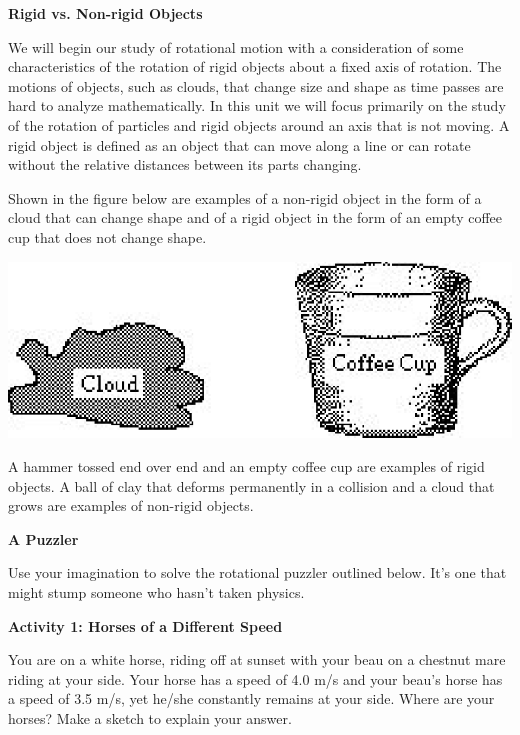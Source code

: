 \textbf{Rigid vs. Non-rigid Objects} 

We will begin our study of rotational motion with a consideration of some characteristics
of the rotation of rigid objects about a fixed axis of rotation. The motions
of objects, such as clouds, that change size and shape as time passes are hard
to analyze mathematically. In this unit we will focus primarily on the study
of the rotation of particles and rigid objects around an axis that is not moving.
A rigid object is defined as an object that can move along a line or can rotate
without the relative distances between its parts changing. 

Shown in the figure below are examples of a non-rigid object in the form of
a cloud that can change shape and of a rigid object in the form of an empty
coffee cup that does not change shape.

\vspace{0.3cm}
{\par\centering \includegraphics{rotation/rotation_fig1.eps} \par}
\vspace{0.3cm}

A hammer tossed end over end and an empty coffee cup are examples of rigid objects.
A ball of clay that deforms permanently in a collision and a cloud that grows
are examples of non-rigid objects. 
\vspace{0.3cm}

\textbf{A Puzzler} 

Use your imagination to solve the rotational puzzler outlined below. It's one
that might stump someone who hasn't taken physics.

\textbf{Activity 1: Horses of a Different Speed }

You are on a white horse, riding off at sunset with your beau on a chestnut
mare riding at your side. Your horse has a speed of 4.0 m/s and your beau's
horse has a speed of 3.5 m/s, yet he/she constantly remains at your side. Where
are your horses? Make a sketch to explain your answer.

